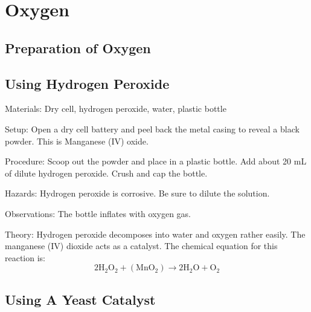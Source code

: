 \section{Oxygen}

\begin{multicols}{2}


\section*{Preparation of Oxygen}


\subsection{Using Hydrogen Peroxide}


\begin{description*}
\item[Materials:]{Dry cell, hydrogen peroxide, water, plastic bottle}
\item[Setup:]{Open a dry cell battery and peel back the metal casing to reveal a black powder. This is Manganese (IV) oxide. }
\item[Procedure:]{Scoop out the powder and place in a plastic bottle. Add about 20 mL of dilute hydrogen peroxide. Crush and cap the bottle.}
\item[Hazards:]{Hydrogen peroxide is corrosive. Be sure to dilute the solution.}
\item[Observations:]{The bottle inflates with oxygen gas.}
\item[Theory:]{Hydrogen peroxide decomposes into water and oxygen rather easily. The manganese (IV) dioxide acts as a catalyst. The chemical equation for this reaction is: \[ 2\mathrm{H}_2\mathrm{O}_2 + ( \mathrm{Mn}\mathrm{O}_2 ) \longrightarrow 2\mathrm{H}_2\mathrm{O} + \mathrm{O}_2 \]}
\end{description*}

\subsection{Using A Yeast Catalyst} %


\end{multicols}

